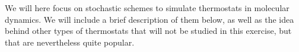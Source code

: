 \documentclass[a4paper,11pt]{scrartcl}
\begin{document}
We will here focus on stochastic schemes to simulate thermostats in molecular dynamics. We will include a brief description of them below, as well as the idea behind other types
of thermostats that will not be studied in this exercise, but that are nevertheless quite popular.


\begin{enumerate}
%


\end{enumerate}
\end{document}
